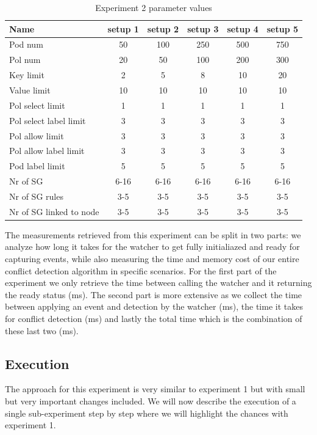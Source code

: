 \begin{table}[H]
    \centering
    \begin{tabular}{|l|c|c|c|c|c|}
        \hline
        \textbf{Name} & \textbf{setup 1} & \textbf{setup 2} & \textbf{setup 3} & \textbf{setup 4} & \textbf{setup 5}\\
        \hline
        Pod num & 50 & 100 & 250 & 500 & 750 \\
        Pol num & 20 & 50 & 100 & 200 & 300 \\
        Key limit & 2 & 5 & 8 & 10 & 20 \\
        Value limit & 10 & 10 & 10 & 10 & 10 \\
        Pol select limit & 1 & 1 & 1 & 1 & 1 \\
        Pol select label limit & 3 & 3 & 3 & 3 & 3 \\
        Pol allow limit & 3 & 3 & 3 & 3 & 3 \\
        Pol allow label limit & 3 & 3 & 3 & 3 & 3 \\
        Pod label limit & 5 & 5 & 5 & 5 & 5 \\
        Nr of SG & 6-16 & 6-16 & 6-16 & 6-16 & 6-16\\
        Nr of SG rules & 3-5 &3-5 & 3-5 & 3-5 & 3-5\\
        Nr of SG linked to node & 3-5 &3-5 & 3-5 & 3-5 & 3-5\\
	
        \hline
    \end{tabular}
    \caption{Experiment 2 parameter values}
    \label{tab:exp2pars}
\end{table}

The measurements retrieved from this experiment can be split in two parts: we analyze how long it takes for the watcher to get fully initialiazed and ready for capturing events, while also measuring the time and memory cost of our entire conflict detection algorithm in specific scenarios. For the first part of the experiment we only retrieve the time between calling the watcher and it returning the ready status (ms). The second part is more extensive as we collect the time between applying an event and detection by the watcher (ms), the time it takes for conflict detection (ms) and lastly the total time which is the combination of these last two (ms). 

\subsection{Execution} \label{exp2:execution}
The approach for this experiment is very similar to experiment 1 but with small but very important changes included.  We will now describe the execution of a single sub-experiment step by step where we will highlight the chances with experiment 1.
\\[10pt]


